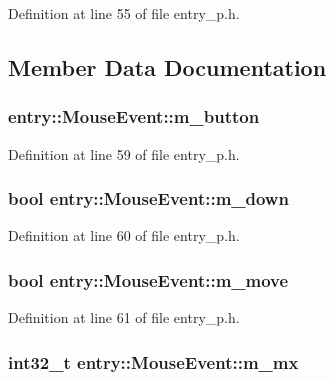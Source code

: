 Definition at line 55 of file entry\+\_\+p.\+h.



\subsection{Member Data Documentation}
\hypertarget{structentry_1_1_mouse_event_a8cdc0d9dd11adc7b657821c1a839da86}{
\subsubsection[{m\+\_\+button}]{ entry\+::\+Mouse\+Event\+::m\+\_\+button}}\label{structentry_1_1_mouse_event_a8cdc0d9dd11adc7b657821c1a839da86}


Definition at line 59 of file entry\+\_\+p.\+h.

\hypertarget{structentry_1_1_mouse_event_a6609af582bf1fd72b9b4e7745069ef77}{
\subsubsection[{m\+\_\+down}]{\setlength{\rightskip}{0pt plus 5cm}bool entry\+::\+Mouse\+Event\+::m\+\_\+down}}\label{structentry_1_1_mouse_event_a6609af582bf1fd72b9b4e7745069ef77}


Definition at line 60 of file entry\+\_\+p.\+h.

\hypertarget{structentry_1_1_mouse_event_af612d206104bf2c27881b8dc6d64774c}{
\subsubsection[{m\+\_\+move}]{\setlength{\rightskip}{0pt plus 5cm}bool entry\+::\+Mouse\+Event\+::m\+\_\+move}}\label{structentry_1_1_mouse_event_af612d206104bf2c27881b8dc6d64774c}


Definition at line 61 of file entry\+\_\+p.\+h.

\hypertarget{structentry_1_1_mouse_event_a850d2acae08dfb96c4ec9cfcc04fe4ca}{
\subsubsection[{m\+\_\+mx}]{\setlength{\rightskip}{0pt plus 5cm}int32\+\_\+t entry\+::\+Mouse\+Event\+::m\+\_\+mx}}\label{structentry_1_1_mouse_event_a850d2acae08dfb96c4ec9cfcc04fe4ca}


